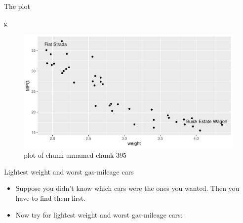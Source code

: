 \documentclass[ignorenonframetext,]{beamer}
\newenvironment{Shaded}{\begin{snugshade}}{\end{snugshade}}
\newcommand{\DataTypeTok}[1]{\textcolor[rgb]{0.13,0.29,0.53}{#1}}
\newcommand{\KeywordTok}[1]{\textcolor[rgb]{0.13,0.29,0.53}{\textbf{#1}}}
\newcommand{\NormalTok}[1]{#1}
\newcommand{\OperatorTok}[1]{\textcolor[rgb]{0.81,0.36,0.00}{\textbf{#1}}}
\newcommand{\StringTok}[1]{\textcolor[rgb]{0.31,0.60,0.02}{#1}}
\providecommand{\tightlist}{%
  \setlength{\itemsep}{0pt}\setlength{\parskip}{0pt}}
\begin{document}
\begin{frame}[fragile]{The plot}
\protect\hypertarget{the-plot-6}{}

\begin{Shaded}
\begin{Highlighting}[]
\NormalTok{g}
\end{Highlighting}
\end{Shaded}

\begin{figure}
\centering
\includegraphics{figure/unnamed-chunk-395-1.pdf}
\caption{plot of chunk unnamed-chunk-395}
\end{figure}

\end{frame}

\begin{frame}[fragile]{Lightest weight and worst gas-mileage cars}
\protect\hypertarget{lightest-weight-and-worst-gas-mileage-cars}{}

\begin{itemize}
\tightlist
\item
  Suppose you didn't know which cars were the ones you wanted. Then you
  have to find them first.
\item
  Now try for lightest weight and worst gas-mileage cars:
\end{itemize}

\begin{Shaded}
\end{Shaded}

\end{frame}
\end{document}
